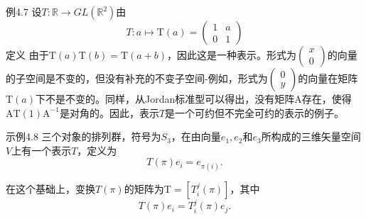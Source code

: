 \documentclass[hyperref,UTF8]{ctexbook}
\begin{document}
例4.7 设$T: \mathbb{R} \rightarrow G L\left(\mathbb{R}^2\right)$由$$T: a \mapsto \mathrm{T}(a)=\begin{pmatrix}
1 & a \\
0 & 1
\end{pmatrix}$$定义
由于$\mathrm{T}(a) \mathrm{T}(b)=\mathrm{T}(a+b)$，因此这是一种表示。形式为$\begin{pmatrix}x \\ 0\end{pmatrix}$的向量的子空间是不变的，但没有补充的不变子空间-例如，形式为$\begin{pmatrix}0 \\ y\end{pmatrix}$的向量在矩阵$\mathrm{T}(a)$下不是不变的。同样，从Jordan标准型可以得出，没有矩阵A存在，使得$\mathrm{AT}(1) \mathrm{A}^{-1}$是对角的。因此，表示$T$是一个可约但不完全可约的表示的例子。

示例4.8 三个对象的排列群，符号为$S_3$，在由向量$e_1, e_2$和$e_3$所构成的三维矢量空间$V$上有一个表示$T$，定义为
$$
T(\pi) e_i=e_{\pi(i)} .
$$

在这个基础上，变换$T(\pi)$的矩阵为$\mathrm{T}=\left[T_i^j(\pi)\right]$，其中
$$
T(\pi) e_i=T_i^j(\pi) e_j .
$$
\end{document}
